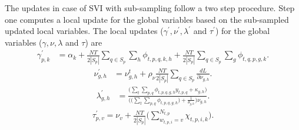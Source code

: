 \documentclass{sig-alternate}
\begin{document}
The updates in case of SVI with sub-sampling follow a two step procedure. Step
one computes a local update for the global variables based on the sub-sampled
updated local variables. The local updates ($\gamma^{'},
\nu^{'}, \lambda^{'}$ and $\tau^{'}$) for the global variables ($\gamma,
\nu, \lambda$ and $\tau$) are
\small
\begin{align}
\gamma_{p,k}^{'} &= \alpha_{k} + \frac{NT}{2|S_p|}\sum_{q \in S_p} \sum_{h}
\! \phi_{t,p,q,k,h} + \frac{NT}{2|S_p|}\sum_{q \in S_p} \! \sum_{g} \!
\phi_{t,q,p,g,k}. 
\label{eqn:gammaUpStoc}
\end{align}
\vspace*{-1.5\baselineskip}
\begin{align}
\nu_{g,h}^{'} &= \nu_{g,h}^{t}+\rho_\nu \frac{NT}{2|S_p|}\sum_{q \in
S_p}\frac{dL}{\partial\nu_{g,h}}.
\label{eqn:nuUpStoc}
\end{align}
\vspace*{-1.5\baselineskip}
\begin{align}
\lambda_{g,h}^{'} &= \frac{\bigg( \sum_{t} \! \sum_{p,q} \! \phi_{t,p,q,g,h}
y_{t,p,q} + \kappa_{g,h} \bigg) }{
 \bigg( \bigg( \sum_{t} \! \sum_{p,q} \! \phi_{t,p,q,g,h} \bigg) + 
\frac{1}{\theta_{g,h}} \bigg) \nu_{g,h}}.
\label{eqn:lambdaUpStoc}
\end{align}
\vspace*{-1.5\baselineskip}
\begin{align}
\tau_{p,v}^{'} = \nu_{v} + \frac{NT}{2|S_p|} 
\bigg(\sum_{w_{t,p,i}=v}^{N_{t,p}} \chi_{t,p,i,k} \bigg). 
\label{eqn:tauUpStoc}
\end{align} 
\normalsize
\IncMargin{1em}
\end{document}
